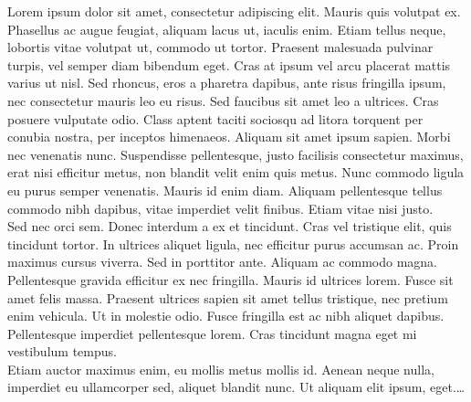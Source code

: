 \documentclass[
11pt, %
catalan, %
singlespacing, %
headsepline, %
]{MastersDoctoralThesis} %
\begin{document}


\begin{Abstracte}

Lorem ipsum dolor sit amet, consectetur adipiscing elit. Mauris quis volutpat ex. Phasellus ac augue feugiat, aliquam lacus ut, iaculis enim. Etiam tellus neque, lobortis vitae volutpat ut, commodo ut tortor. Praesent malesuada pulvinar turpis, vel semper diam bibendum eget. Cras at ipsum vel arcu placerat mattis varius ut nisl. Sed rhoncus, eros a pharetra dapibus, ante risus fringilla ipsum, nec consectetur mauris leo eu risus. Sed faucibus sit amet leo a ultrices. Cras posuere vulputate odio. Class aptent taciti sociosqu ad litora torquent per conubia nostra, per inceptos himenaeos. Aliquam sit amet ipsum sapien. Morbi nec venenatis nunc. Suspendisse pellentesque, justo facilisis consectetur maximus, erat nisi efficitur metus, non blandit velit enim quis metus. Nunc commodo ligula eu purus semper venenatis. Mauris id enim diam. Aliquam pellentesque tellus commodo nibh dapibus, vitae imperdiet velit finibus. Etiam vitae nisi justo.\\

Sed nec orci sem. Donec interdum a ex et tincidunt. Cras vel tristique elit, quis tincidunt tortor. In ultrices aliquet ligula, nec efficitur purus accumsan ac. Proin maximus cursus viverra. Sed in porttitor ante. Aliquam ac commodo magna. Pellentesque gravida efficitur ex nec fringilla. Mauris id ultrices lorem. Fusce sit amet felis massa. Praesent ultrices sapien sit amet tellus tristique, nec pretium enim vehicula. Ut in molestie odio. Fusce fringilla est ac nibh aliquet dapibus. Pellentesque imperdiet pellentesque lorem. Cras tincidunt magna eget mi vestibulum tempus.\\

Etiam auctor maximus enim, eu mollis metus mollis id. Aenean neque nulla, imperdiet eu ullamcorper sed, aliquet blandit nunc. Ut aliquam elit ipsum, eget.\ldots
\end{Abstracte}

\end{document}
